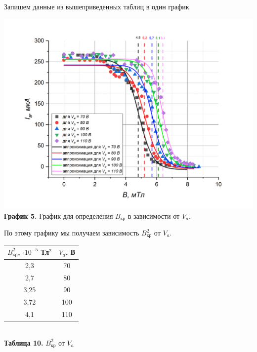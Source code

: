 \documentclass{article}
\begin{document}
\newpage
Запишем данные из вышеприведенных таблиц в один график
\begin{center}
\includegraphics[width = \textwidth]{images/image7.png}\\
\textbf{График 5. } График для определения $B_{\text{кр}}$ в зависимости от $V_a$.
\end{center}

По этому графику мы получаем зависимость $B_{\text{кр}}^2$ от $V_a$.
\begin{center}
\begin{tabular}{|c|c|}
\hline
$B_{\text{кр}}^2$, $\cdot 10^{-5}$ Тл$^2$ & $V_a$, В \\ \hline
2,3 & 70 \\ \hline
2,7 & 80 \\ \hline
3,25 & 90 \\ \hline
3,72 & 100 \\ \hline
4,1 & 110 \\ \hline
\end{tabular}\\
\textbf{Таблица 10.} $B_{\text{кр}}^2$ от $V_a$
\end{center}
\end{document}
